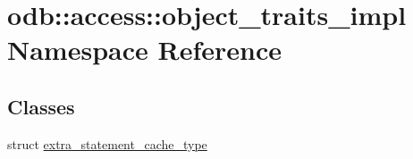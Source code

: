 \hypertarget{namespaceodb_1_1access_1_1object__traits__impl}{}\section{odb\+:\+:access\+:\+:object\+\_\+traits\+\_\+impl Namespace Reference}
\label{namespaceodb_1_1access_1_1object__traits__impl}
\subsection*{Classes}
\begin{DoxyCompactItemize}
\item 
struct \hyperlink{structodb_1_1access_1_1object__traits__impl_1_1extra__statement__cache__type}{extra\+\_\+statement\+\_\+cache\+\_\+type}
\end{DoxyCompactItemize}
